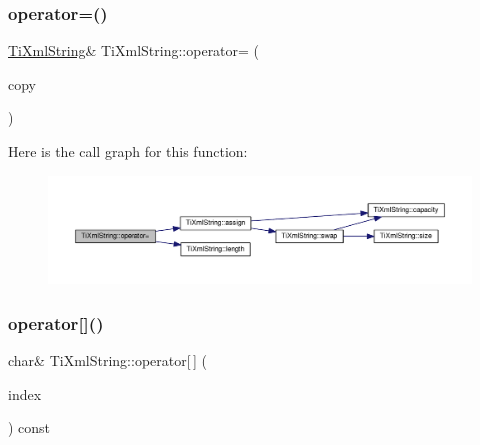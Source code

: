 \subsubsection{\texorpdfstring{operator=()}{operator=()}\hspace{0.1cm}{\footnotesize\ttfamily [2/2]}}
{\footnotesize\ttfamily \hyperlink{class_ti_xml_string}{Ti\+Xml\+String}\& Ti\+Xml\+String\+::operator= (\begin{DoxyParamCaption}\item[{const \hyperlink{class_ti_xml_string}{Ti\+Xml\+String} \&}]{copy }\end{DoxyParamCaption})\hspace{0.3cm}{\ttfamily [inline]}}

Here is the call graph for this function\+:\nopagebreak
\begin{figure}[H]
\begin{center}
\leavevmode
\includegraphics[width=350pt]{class_ti_xml_string_ab1f1f5d3eceaa0f22d0a7e6055ea81b0_cgraph}
\end{center}
\end{figure}
\mbox{\label{class_ti_xml_string_a06e8c84831fc146610369405f4aa4200}} 
\subsubsection{\texorpdfstring{operator[]()}{operator[]()}}
{\footnotesize\ttfamily char\& Ti\+Xml\+String\+::operator\mbox{[}$\,$\mbox{]} (\begin{DoxyParamCaption}\item[{\hyperlink{class_ti_xml_string_abeb2c1893a04c17904f7c06546d0b971}{size\+\_\+type}}]{index }\end{DoxyParamCaption}) const\hspace{0.3cm}{\ttfamily [inline]}}

